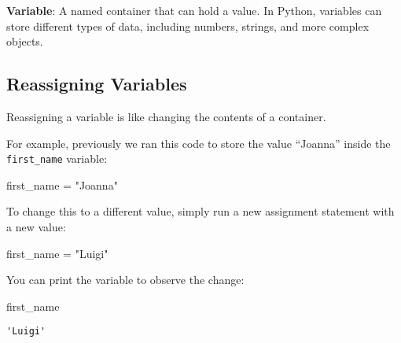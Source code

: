 \documentclass[
  letterpaper,
  DIV=11,
  numbers=noendperiod]{scrreprt}
\newenvironment{Shaded}{\begin{snugshade}}{\end{snugshade}}
\newcommand{\NormalTok}[1]{\textcolor[rgb]{0.00,0.23,0.31}{#1}}
\newcommand{\OperatorTok}[1]{\textcolor[rgb]{0.37,0.37,0.37}{#1}}
\newcommand{\StringTok}[1]{\textcolor[rgb]{0.13,0.47,0.30}{#1}}
\begin{document}
\begin{tcolorbox}[enhanced jigsaw, colframe=quarto-callout-note-color-frame, opacityback=0, titlerule=0mm, bottomrule=.15mm, breakable, leftrule=.75mm, colbacktitle=quarto-callout-note-color!10!white, title=\textcolor{quarto-callout-note-color}{\faInfo}\hspace{0.5em}{Vocab}, rightrule=.15mm, coltitle=black, opacitybacktitle=0.6, colback=white, left=2mm, arc=.35mm, toptitle=1mm, bottomtitle=1mm, toprule=.15mm]

\textbf{Variable}: A named container that can hold a value. In Python,
variables can store different types of data, including numbers, strings,
and more complex objects.

\end{tcolorbox}

\subsection{Reassigning Variables}\label{reassigning-variables}

Reassigning a variable is like changing the contents of a container.

For example, previously we ran this code to store the value ``Joanna''
inside the \texttt{first\_name} variable:

\begin{Shaded}
\begin{Highlighting}[]
\NormalTok{first\_name }\OperatorTok{=} \StringTok{"Joanna"}
\end{Highlighting}
\end{Shaded}

To change this to a different value, simply run a new assignment
statement with a new value:

\begin{Shaded}
\begin{Highlighting}[]
\NormalTok{first\_name }\OperatorTok{=} \StringTok{"Luigi"}
\end{Highlighting}
\end{Shaded}

You can print the variable to observe the change:

\begin{Shaded}
\begin{Highlighting}[]
\NormalTok{first\_name}
\end{Highlighting}
\end{Shaded}

\begin{verbatim}
'Luigi'
\end{verbatim}
\end{document}
